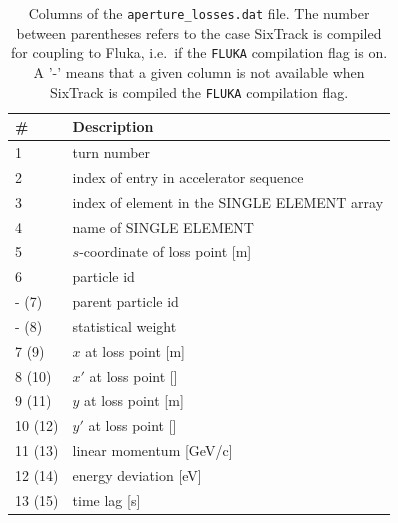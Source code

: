 \begin{center}
\begin{longtable}{|l|l|}%
  \caption{Columns of the \texttt{aperture\_losses.dat} file. The number between
    parentheses refers to the case SixTrack is compiled for coupling to Fluka, i.e.~if
    the \texttt{FLUKA} compilation flag is on. A '-' means that a given column is
    not available when SixTrack is compiled the \texttt{FLUKA} compilation flag.}
    \label{tab:apeLossesFileFormat} \\*
    \hline
    \rowcolor{blue!30}
    \# & Description \\*
    \hline
    \endfirsthead

    1  & turn number \\*
    2  & index of entry in accelerator sequence \\*
    3  & index of element in the SINGLE ELEMENT array \\*
    4  & name of SINGLE ELEMENT \\*
    5  & $s$-coordinate of loss point [m] \\*
    6  & particle id \\*
    -   (7) & parent particle id \\*
    -   (8) & statistical weight \\*
    7   (9) & $x$ at loss point [m] \\*
    8  (10) & $x'$ at loss point [] \\*
    9  (11) & $y$ at loss point [m] \\*
    10 (12) & $y'$ at loss point [] \\*
    11 (13) & linear momentum [GeV/c] \\*
    12 (14) & energy deviation [eV] \\*
    13 (15) & time lag [s] \\*
    \hline

\end{longtable}
\end{center}

